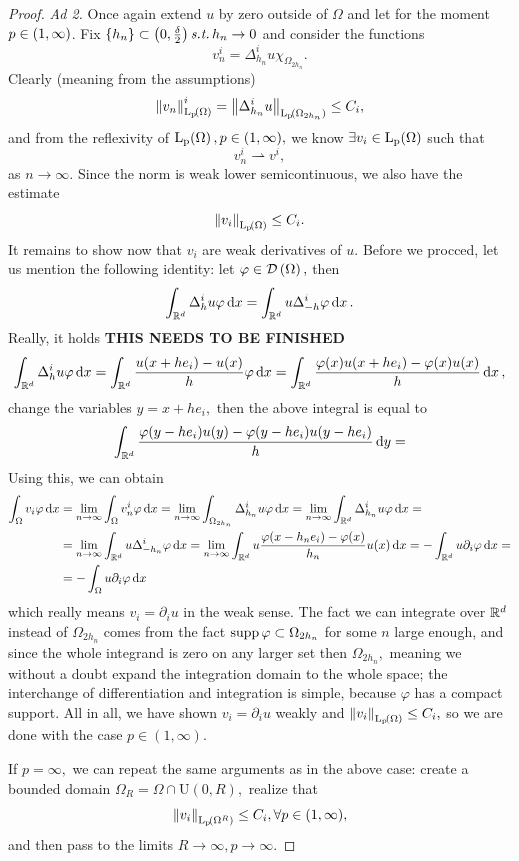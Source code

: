 \documentclass{article}
\begin{document}
\begin{proof}
	\textit{Ad 2.}
	Once again extend $u$ by zero outside of $\Omega$ and let for the moment $p \in \qty(1,\infty)$. Fix $\qty{h_n} \subset \qty(0, \frac{\delta}{2}) \, \text{\textit{s.t.}} \, h_n \to 0$ and consider the functions
	\[
		v_n^i = \Delta_{h_n}^i u \chi_{\Omega_{2 h_n}}.
	\]
	Clearly (meaning from the assumptions)
	\[
		\norm{v_n}^i_{\LpSet{\Omega}} = \norm{\Delta^i_{{h_n}} u}_{\LpSet{\Omega_{2 h_n}}}  \leq C_i,
	\]
	and from the reflexivity of $\LpSet{\Omega}, p \in \qty(1, \infty),$ we know $\exists v_i \in \LpSet{\Omega}$ such that
	\[
		v_n^i \rightharpoonup v^i,
	\]
	as $n \to \infty.$ Since the norm is weak lower semicontinuous, we also have the estimate
	\[
		\norm{v_i}_{\LpSet{\Omega}} \leq C_i.
	\]
	It remains to show now that $v_i$ are weak derivatives of $u$. Before we procced, let us mention the following identity: let $\varphi \in \mathcal{D}\!\,\left(\Omega \right),$ then
	\[
		\int_{{\mathbb R}^{d}}\Delta_h^i u \varphi\dd{x} = \int_{{\mathbb R}^{d}}u \Delta_{-h}^i \varphi\dd{x}.
	\]
	Really, it holds \textbf{THIS NEEDS TO BE FINISHED}
	\[
		\int_{{\mathbb R}^{d}}\Delta_h^i u \varphi\dd{x} = \int_{{\mathbb R}^{d}}\frac{u\qty(x+he_i) - u\qty(x)}{h}\varphi\dd{x} = \int_{{\mathbb R}^{d}}\frac{\varphi(x) u\qty(x+he_i) - \varphi(x) u(x)}{h}\dd{x},
	\]
	change the variables $y = x+ he_i,$ then the above integral is equal to
	\[
		\int_{{\mathbb R}^{d}}\frac{\varphi\qty(y - he_i)u(y) - \varphi(y - he_i) u\qty(y-he_i)}{h}\dd{y} =
	\]
	Using this, we can obtain 
	\begin{align*}
		\int_{\Omega}v_i \varphi\dd{x} &= \lim_{n \to \infty}\int_{\Omega}v_n^i \varphi \dd{x} = \lim_{n \to \infty}\int_{\Omega_{2h_n}}\Delta_{h_n}^i u \varphi\dd{x} = \lim_{n \to \infty} \int_{{\mathbb R}^{d}}\Delta_{h_n}^i u \varphi\dd{x} = \\
					       &= \lim_{n\to \infty}\int_{{\mathbb R}^{d}}u \Delta_{-h_n}^i \varphi \dd{x} = \lim_{n \to \infty}\int_{{\mathbb R}^{d}}u \frac{\varphi(x- h_n e_i) - \varphi(x)}{h_n}u(x)\dd{x} =  -\int_{{\mathbb R}^{d}}u \partial_{i}\varphi\dd{x} = \\
					       &=- \int_{\Omega}u \partial_{i} \varphi \dd{x}
	\end{align*}
which really means $v_i = \partial_{i} u$ in the weak sense. The fact we can integrate over ${\mathbb R}^{d}$ instead of $\Omega_{2h_n}$ comes from the fact $\operatorname{supp} \varphi \subset \Omega_{2h_n}$ for some $n$ large enough, and since the whole integrand is zero on any larger set then $\Omega_{2h_n},$ meaning we without a doubt expand the integration domain to the whole space; the interchange of differentiation and integration is simple, because $\varphi$ has a compact support. All in all, we have shown $v_i = \partial_{i} u$ weakly and $\norm{v_i}_{\LpSet{\Omega}} \leq C_i,$ so we are done with the case $p \in (1, \infty).$

If $p = \infty,$ we can repeat the same arguments as in the above case: create a bounded domain $\Omega_R = \Omega \cap \text{U}(0,R),$ realize that
\[
	\norm{v_i}_{\LpSet{\Omega^R}} \leq C_i, \forall p \in (1, \infty),
\]
and then pass to the limits $R \to \infty, p \to \infty.$

\end{proof}
\end{document}
